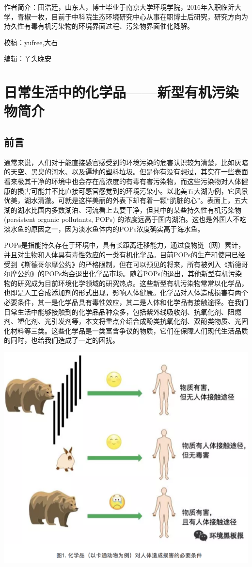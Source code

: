 \documentclass[]{book}
\begin{document}
作者简介：田浩廷，山东人，博士毕业于南京大学环境学院，2016年入职临沂大学，青椒一枚，目前于中科院生态环境研究中心从事在职博士后研究，研究方向为持久性有毒有机污染物的环境界面过程、污染物界面催化降解。

校稿：yufree,大石

编辑：丫头晚安

\section{日常生活中的化学品------新型有机污染物简介}

\subsection{前言}\label{-2}

通常来说，人们对于能直接感官感受到的环境污染的危害认识较为清楚，比如灰暗的天空、黑臭的河水、以及遍地的塑料垃圾。但是你有没有想过，其实在一些表面看来极其干净的环境中也会存在高浓度的有毒有害污染物，而这些污染物对人体健康的损害可能并不比直接可感官感觉到的环境污染小。以北美五大湖为例，它风景优美，湖水清澈。可就是这样美丽的外表下却有着一颗``肮脏的心''。表面上，五大湖的湖水比国内多数湖泊、河流看上去要干净，但其中的某些持久性有机污染物
(persistent organic pollutants, POPs)
的浓度远高于国内湖泊。这也是外国人不吃淡水鱼的原因之一，因为淡水鱼体内的POPs浓度确实高于海水鱼。

POPs是指能持久存在于环境中，具有长距离迁移能力，通过食物链（网）累计，并且对生物和人体具有毒性效应的一类有机化学品。目前POPs的生产和使用已经受到《斯德哥尔摩公约》的严格限制，但在可以预见的将来，所有被列入《斯德哥尔摩公约》的POPs均会退出化学品市场。随着POPs的退出，其他新型有机污染物的研究成为目前环境化学领域的研究热点。这些新型有机污染物常常以化学品，也即是人工合成添加剂的形式出现，影响人体健康。化学品对人体造成损害有两个必要条件，其一是化学品具有毒性效应，其二是人体和化学品有接触途径。在我们日常生活中能够接触到的化学品品种众多，包括紫外线吸收剂、抗氧化剂、阻燃剂、塑化剂、光引发剂等，本文将重点介绍合成酚类抗氧化剂、双酚类物质、光固化材料等三类。这些化学品是一类富含争议的物质，它们在保障人们现代生活品质的同时，也给我们造成了一定的困扰。

\includegraphics[width=8.33in]{images/epc1}
\end{document}
